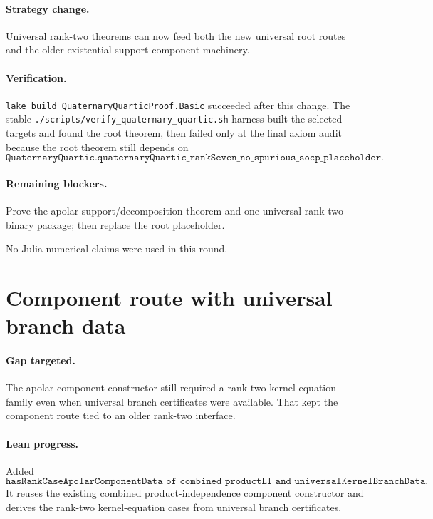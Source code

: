 \documentclass[11pt]{article}
\begin{document}
\paragraph{Strategy change.}
Universal rank-two theorems can now feed both the new universal root routes and
the older existential support-component machinery.

\paragraph{Verification.}
\texttt{lake build QuaternaryQuarticProof.Basic} succeeded after this change.
The stable \texttt{./scripts/verify\_quaternary\_quartic.sh} harness built the
selected targets and found the root theorem, then failed only at the final axiom
audit because the root theorem still depends on
\[
\texttt{QuaternaryQuartic.quaternaryQuartic\_rankSeven\_no\_spurious\_socp\_placeholder}.
\]

\paragraph{Remaining blockers.}
Prove the apolar support/decomposition theorem and one universal rank-two
binary package; then replace the root placeholder.

No Julia numerical claims were used in this round.

\section*{Component route with universal branch data}

\paragraph{Gap targeted.}
The apolar component constructor still required a rank-two kernel-equation
family even when universal branch certificates were available.  That kept the
component route tied to an older rank-two interface.

\paragraph{Lean progress.}
Added
\[
\texttt{hasRankCaseApolarComponentData\_of\_combined\_productLI\_and\_universalKernelBranchData}.
\]
It reuses the existing combined product-independence component constructor and
derives the rank-two kernel-equation cases from universal branch certificates.
\end{document}
